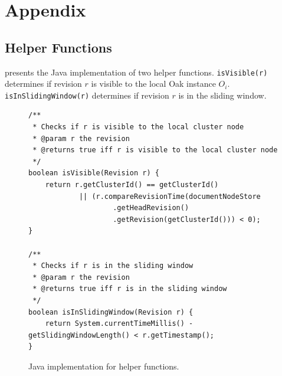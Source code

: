 \documentclass[abstracton,12pt]{scrartcl}
\theoremstyle{definition}
\begin{document}
\newpage




\newpage

\section{Appendix}

\subsection{Helper Functions}

 presents the Java implementation of two helper functions.
\texttt{isVisible(r)} determines if revision $r$ is visible to the local Oak instance $O_i$.
\texttt{isInSlidingWindow(r)} determines if revision $r$ is in the sliding window.

\begin{figure}[h]
    \begin{framed}
        \begin{scriptsize}
            \begin{verbatim}
/**
 * Checks if r is visible to the local cluster node
 * @param r the revision
 * @returns true iff r is visible to the local cluster node
 */
boolean isVisible(Revision r) {
    return r.getClusterId() == getClusterId()
            || (r.compareRevisionTime(documentNodeStore
                    .getHeadRevision()
                    .getRevision(getClusterId())) < 0);
}

/**
 * Checks if r is in the sliding window
 * @param r the revision
 * @returns true iff r is in the sliding window
 */
boolean isInSlidingWindow(Revision r) {
    return System.currentTimeMillis() - getSlidingWindowLength() < r.getTimestamp();
}
            \end{verbatim}
        \end{scriptsize}
    \end{framed}
    \caption{Java implementation for helper functions.}
    \label{fig:helper^functions}
\end{figure}
\end{document}
